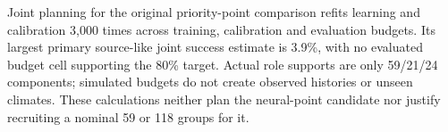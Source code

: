 Joint planning for the original priority-point comparison refits learning and calibration 3,000 times across training, calibration and evaluation budgets. Its largest primary source-like joint success estimate is 3.9\%, with no evaluated budget cell supporting the 80\% target. Actual role supports are only 59/21/24 components; simulated budgets do not create observed histories or unseen climates. These calculations neither plan the neural-point candidate nor justify recruiting a nominal 59 or 118 groups for it.
